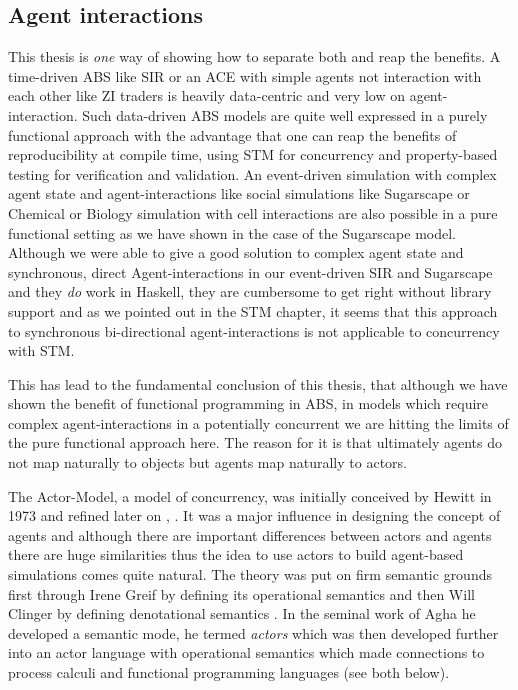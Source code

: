 \subsection{Agent interactions}
This thesis is \textit{one} way of showing how to separate both and reap the benefits. A time-driven ABS like SIR or an ACE with simple agents not interaction with each other like ZI traders is heavily data-centric and very low on agent-interaction. Such data-driven ABS models are quite well expressed in a purely functional approach with the advantage that one can reap the benefits of reproducibility at compile time, using STM for concurrency and property-based testing for verification and validation. An event-driven simulation with complex agent state and agent-interactions like social simulations like Sugarscape or Chemical or Biology simulation with cell interactions are also possible in a pure functional setting as we have shown in the case of the Sugarscape model. Although we were able to give a good solution to complex agent state and synchronous, direct Agent-interactions in our event-driven SIR and Sugarscape and they \textit{do} work in Haskell, they are cumbersome to get right without library support and as we pointed out in the STM chapter, it seems that this approach to synchronous bi-directional agent-interactions is not applicable to concurrency with STM. 

This has lead to the fundamental conclusion of this thesis, that although we have shown the benefit of functional programming in ABS, in models which require complex agent-interactions in a potentially concurrent we are hitting the limits of the pure functional approach here. The reason for it is that ultimately agents do not map naturally to objects but agents map naturally to actors. 

The Actor-Model, a model of concurrency, was initially conceived by Hewitt in 1973 \cite{hewitt_universal_1973} and refined later on \cite{hewitt_what_2007}, \cite{hewitt_actor_2010}. It was a major influence in designing the concept of agents and although there are important differences between actors and agents there are huge similarities thus the idea to use actors to build agent-based simulations comes quite natural. The theory was put on firm semantic grounds first through Irene Greif by defining its operational semantics \cite{grief_semantics_1975} and then Will Clinger by defining denotational semantics \cite{clinger_foundations_1981}. In the seminal work of Agha \cite{agha_actors:_1986} he developed a semantic mode, he termed \textit{actors} which was then developed further \cite{agha_foundation_1997} into an actor language with operational semantics which made connections to process calculi and functional programming languages (see both below). 

